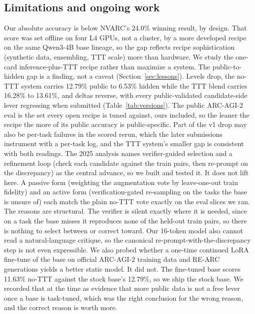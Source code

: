 \documentclass[11pt]{article}
\begin{document}
\subsection{Limitations and ongoing work}
\label{sec:limits}
Our absolute accuracy is below NVARC's 24.0\% winning result, by design. That score was set offline on
four L4 GPUs, not a cluster, by a more developed recipe on the same Qwen3-4B base lineage, so the gap
reflects recipe sophistication (synthetic data, ensembling, TTT scale) more than hardware. We study the
one-card inference-plus-TTT recipe rather than maximize a system.
The public-to-hidden gap is a finding, not a caveat (Section~\ref{sec:lessons}). Levels drop, the
no-TTT system carries 12.79\% public to 6.53\% hidden while the TTT blend carries 16.28\% to 13.61\%,
and deltas reverse, with every public-validated candidate-side lever regressing when submitted
(Table~\ref{tab:versions}). The public ARC-AGI-2 eval is the set every open recipe is tuned against,
ours included, so the leaner the recipe the more of its public accuracy is public-specific. Part of
the v1 drop may also be per-task failures in the scored rerun, which the later submissions instrument
with a per-task log, and the TTT system's smaller gap is consistent with both readings.
The 2025 analysis names verifier-guided selection and a refinement loop (check each candidate against
the train pairs, then re-prompt on the discrepancy) as the central advance, so we built and tested it.
It does not lift here. A passive form (weighting the augmentation vote by leave-one-out train fidelity)
and an active form (verification-gated re-sampling on the tasks the base is unsure of) each match the
plain no-TTT vote exactly on the eval slices we ran. The reasons are structural. The verifier is silent
exactly where it is needed, since on a task the base misses it reproduces none of the held-out train
pairs, so there is nothing to select between or correct toward. Our 16-token model also cannot read a
natural-language critique, so the canonical re-prompt-with-the-discrepancy step is not even expressible. We also probed whether a one-time continued LoRA fine-tune of the base on official ARC-AGI-2 training
data and RE-ARC~\cite{rearc} generations yields a better static model. It did not. The fine-tuned base
scores 11.63\% no-TTT against the stock base's 12.79\%, so we ship the stock base. We recorded that at
the time as evidence that more public data is not a free lever once a base is task-tuned, which was the
right conclusion for the wrong reason, and the correct reason is worth more.
\end{document}
